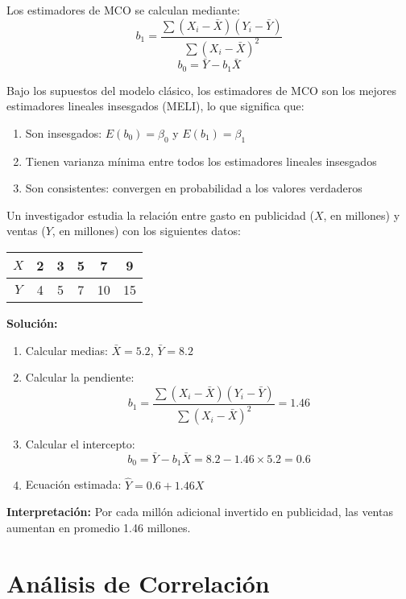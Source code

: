 Los estimadores de MCO se calculan mediante:
$$b_1 = \frac{\sum (X_i - \bar{X})(Y_i - \bar{Y})}{\sum (X_i - \bar{X})^2}$$
$$b_0 = \bar{Y} - b_1 \bar{X}$$

\begin{theorem}
Bajo los supuestos del modelo clásico, los estimadores de MCO son los mejores estimadores lineales insesgados (MELI), lo que significa que:
\begin{enumerate}
\item Son insesgados: $E(b_0) = \beta_0$ y $E(b_1) = \beta_1$
\item Tienen varianza mínima entre todos los estimadores lineales insesgados
\item Son consistentes: convergen en probabilidad a los valores verdaderos
\end{enumerate}
\end{theorem}

\begin{example}
Un investigador estudia la relación entre gasto en publicidad ($X$, en millones) y ventas ($Y$, en millones) con los siguientes datos:

\begin{center}
\begin{tabular}{|c|c|c|c|c|c|}
\hline
$X$ & 2 & 3 & 5 & 7 & 9 \\
\hline
$Y$ & 4 & 5 & 7 & 10 & 15 \\
\hline
\end{tabular}
\end{center}

\textbf{Solución:}
\begin{enumerate}
\item Calcular medias: $\bar{X} = 5.2$, $\bar{Y} = 8.2$
\item Calcular la pendiente:
$$b_1 = \frac{\sum (X_i - \bar{X})(Y_i - \bar{Y})}{\sum (X_i - \bar{X})^2} = 1.46$$
\item Calcular el intercepto:
$$b_0 = \bar{Y} - b_1 \bar{X} = 8.2 - 1.46 \times 5.2 = 0.6$$
\item Ecuación estimada: $\hat{Y} = 0.6 + 1.46X$
\end{enumerate}

\textbf{Interpretación:} Por cada millón adicional invertido en publicidad, las ventas aumentan en promedio 1.46 millones.
\end{example}

\section{Análisis de Correlación}

